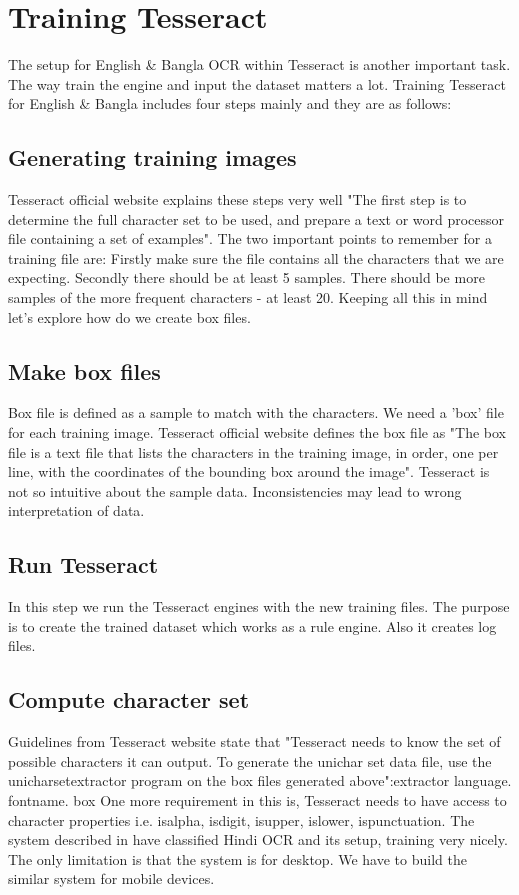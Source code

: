 \section{Training Tesseract}
The setup for English \& Bangla OCR within Tesseract is another important task. The way train the engine and input the dataset matters a lot.\cite{TesseractTrain}
Training Tesseract for English \& Bangla includes four steps mainly and they are as follows:
\subsection{Generating training images}
Tesseract official website explains these steps very well "The first step is to determine the full
character set to be used, and prepare a text or word processor file containing a set of examples". The two important points to remember for a training file are: Firstly make sure the file
contains all the characters that we are expecting. Secondly there should be at least 5 samples.
There should be more samples of the more frequent characters - at least 20. Keeping all this
in mind let's explore how do we create box files. \cite{TesseractTrain}
\subsection{Make box files}
Box file is defined as a sample to match with the characters. We need a 'box' file for each
training image. Tesseract official website defines the box file as "The box file is a text file that
lists the characters in the training image, in order, one per line, with the coordinates of the
bounding box around the image". Tesseract is not so intuitive about the sample data.
Inconsistencies may lead to wrong interpretation of data.\cite{TesseractTrain}
\subsection{Run Tesseract}
In this step we run the Tesseract engines with the new training files. The purpose is to create the
trained dataset which works as a rule engine. Also it creates log files.\cite{TesseractTrain}
\subsection{Compute character set} 
Guidelines from Tesseract website state that "Tesseract needs to know the set of possible characters it can output. To generate the unichar set data file, use the unicharset\textunderscore extractor program on the box files generated above":extractor language. fontname. box 
One more requirement in this is, Tesseract needs to have access to character properties i.e.
isalpha, isdigit, isupper, islower, ispunctuation.
The system described in have classified Hindi OCR and its setup, training very nicely.
The only limitation is that the system is for desktop. We have to build the similar system for
mobile devices.\cite{TesseractTrain}
